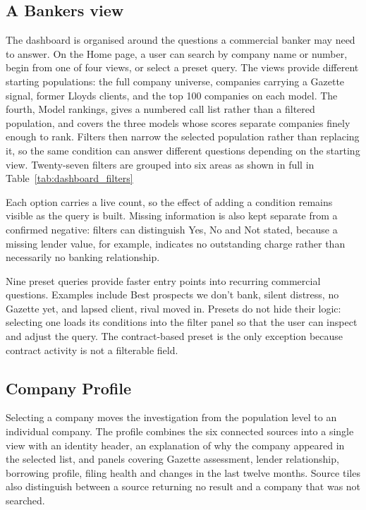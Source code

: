 \documentclass[    author={Samuel Menon Demelo; Sneha Saphala Ram Prasad; 
Viktor Ander Lindholm; Vishal Khatri},
               supervisor={Prof. Fernando Moreno-Pino},
                   degree={MSc},
                    title={Lloyds Commercial Banking Intelligence},
                 subtitle={Ranking SME Lending, Risk and Growth Prospects for Lloyds Banking Group},
                     type={},
                     year={2026}]{dissertation}
\begin{document}
\subsection{A Bankers view}
\label{sec:routing}
The dashboard is organised around the questions a commercial banker may need to answer. On the Home page, a user can search by company name or number, begin from one of four views, or select a preset query. The views provide different starting populations: the full company universe, companies carrying a Gazette signal, former Lloyds clients, and the top 100 companies on each model. The fourth, Model rankings, gives a numbered call list rather than a filtered population, and covers the three models whose scores separate companies finely enough to rank. Filters then narrow the selected population rather than replacing it, so the same condition can answer different questions depending on the starting view. Twenty-seven filters are grouped into six areas as shown in full in Table~\ref{tab:dashboard_filters}

Each option carries a live count, so the effect of adding a condition remains visible as the query is built. Missing information is also kept separate from a confirmed negative: filters can distinguish Yes, No and Not stated, because a missing lender value, for example, indicates no outstanding charge rather than necessarily no banking relationship.

Nine preset queries provide faster entry points into recurring commercial questions. Examples include Best prospects we don't bank, silent distress, no Gazette yet, and lapsed client, rival moved in. Presets do not hide their logic: selecting one loads its conditions into the filter panel so that the user can inspect and adjust the query. The contract-based preset is the only exception because contract activity is not a filterable field.

\subsection{Company Profile}
Selecting a company moves the investigation from the population level to an individual company. The profile combines the six connected sources into a single view with an identity header, an explanation of why the company appeared in the selected list, and panels covering Gazette assessment, lender relationship, borrowing profile, filing health and changes in the last twelve months. Source tiles also distinguish between a source returning no result and a company that was not searched.
\end{document}
